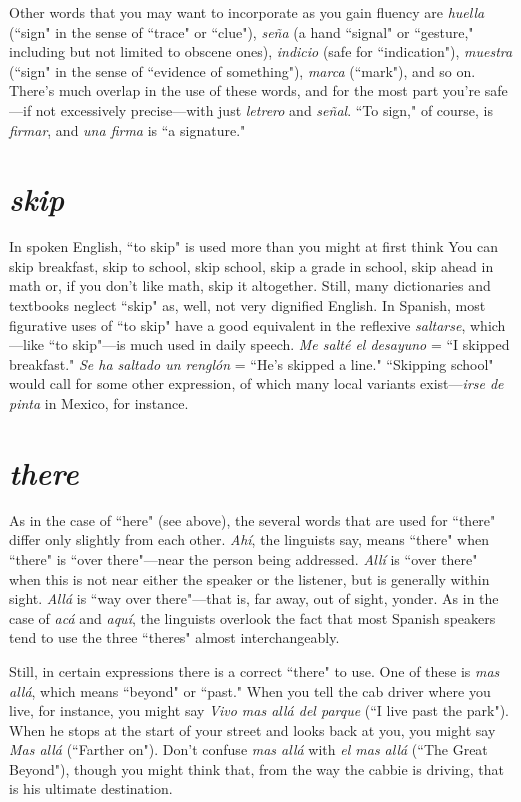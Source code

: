 Other words that you may want to incorporate as you gain fluency are \emph{huella} (``sign" in the sense of ``trace" or ``clue"), \emph{seña} (a hand
``signal" or ``gesture," including but not limited to obscene ones), \emph{indicio} (safe for ``indication"), \emph{muestra} (``sign" in the sense of ``evidence
of something"), \emph{marca} (``mark"), and so on. There's much overlap in
the use of these words, and for the most part you're safe---if not excessively precise---with just \emph{letrero} and \emph{señal}. ``To sign," of course, is \emph{firmar}, and \emph{una firma} is ``a signature."

\section{\emph{skip}}

In spoken English, ``to skip" is used more than you might at
first think You can skip breakfast, skip to school, skip school, skip a
grade in school, skip ahead in math or, if you don't like math, skip it
altogether. Still, many dictionaries and textbooks neglect ``skip" as,
well, not very dignified English. In Spanish, most figurative uses of
``to skip" have a good equivalent in the reflexive \emph{saltarse}, which---like
``to skip"---is much used in daily speech. \emph{Me salté el desayuno} = ``I
skipped breakfast." \emph{Se ha saltado un renglón} = ``He's skipped a line."
``Skipping school" would call for some other expression, of which
many local variants exist---\emph{irse de pinta} in Mexico, for instance.

\section{\emph{there}}

As in the case of ``here" (see above), the several words that are
used for ``there" differ only slightly from each other. \emph{Ahí}, the linguists
say, means ``there" when ``there" is ``over there"---near the person
being addressed. \emph{Allí} is ``over there" when this is not near either the
speaker or the listener, but is generally within sight. \emph{Allá} is ``way over
there"---that is, far away, out of sight, yonder. As in the case of \emph{acá} and
\emph{aquí}, the linguists overlook the fact that most Spanish speakers tend
to use the three ``theres" almost interchangeably.

Still, in certain expressions there is a correct ``there" to use.
One of these is \emph{mas allá}, which means ``beyond" or ``past." When you
tell the cab driver where you live, for instance, you might say \emph{Vivo
	mas allá del parque} (``I live past the park"). When he stops at the start
of your street and looks back at you, you might say \emph{Mas allá} (``Farther
on"). Don't confuse \emph{mas allá} with \emph{el mas allá} (``The Great Beyond"),
though you might think that, from the way the cabbie is driving, that
is his ultimate destination.


